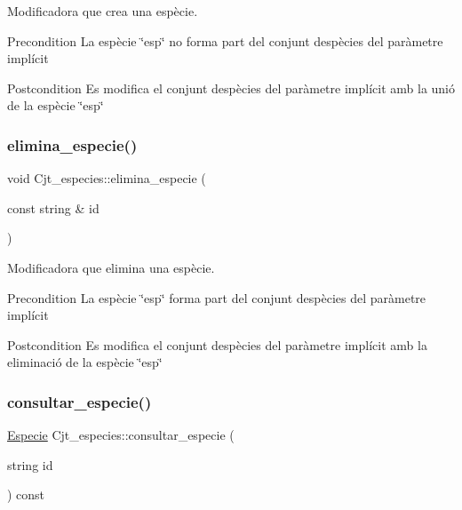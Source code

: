 Modificadora que crea una espècie. 

\begin{DoxyPrecond}{Precondition}
La espècie \char`\"{}esp\char`\"{} no forma part del conjunt d\textquotesingle{}espècies del paràmetre implícit 
\end{DoxyPrecond}
\begin{DoxyPostcond}{Postcondition}
Es modifica el conjunt d\textquotesingle{}espècies del paràmetre implícit amb la unió de la espècie \char`\"{}esp\char`\"{} 
\end{DoxyPostcond}
\mbox{\label{class_cjt__especies_a51059c15bd4c38ff5f21dbb532befa11}} 
\subsubsection{\texorpdfstring{elimina\+\_\+especie()}{elimina\_especie()}}
{\footnotesize\ttfamily void Cjt\+\_\+especies\+::elimina\+\_\+especie (\begin{DoxyParamCaption}\item[{const string \&}]{id }\end{DoxyParamCaption})}



Modificadora que elimina una espècie. 

\begin{DoxyPrecond}{Precondition}
La espècie \char`\"{}esp\char`\"{} forma part del conjunt d\textquotesingle{}espècies del paràmetre implícit 
\end{DoxyPrecond}
\begin{DoxyPostcond}{Postcondition}
Es modifica el conjunt d\textquotesingle{}espècies del paràmetre implícit amb la eliminació de la espècie \char`\"{}esp\char`\"{} 
\end{DoxyPostcond}
\mbox{\label{class_cjt__especies_a3584d5ece74d4260ebd7415a8c7554e5}} 
\subsubsection{\texorpdfstring{consultar\+\_\+especie()}{consultar\_especie()}}
{\footnotesize\ttfamily \hyperlink{class_especie}{Especie} Cjt\+\_\+especies\+::consultar\+\_\+especie (\begin{DoxyParamCaption}\item[{string}]{id }\end{DoxyParamCaption}) const}




